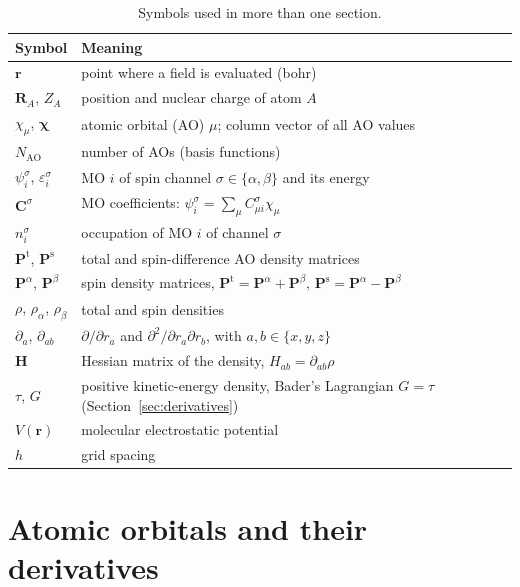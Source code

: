 \documentclass[11pt,a4paper]{article}
\begin{document}
\begin{table}[h]
\centering
\begin{tabular}{@{}ll@{}}
\toprule
Symbol & Meaning\\
\midrule
$\mathbf r$ & point where a field is evaluated (bohr)\\
$\mathbf R_A$, $Z_A$ & position and nuclear charge of atom $A$\\
$\chi_\mu$, $\boldsymbol\chi$ & atomic orbital (AO) $\mu$; column vector of all AO values\\
$N_{\mathrm{AO}}$ & number of AOs (basis functions)\\
$\psi_i^\sigma$, $\varepsilon_i^\sigma$ & MO $i$ of spin channel $\sigma\in\{\alpha,\beta\}$ and its energy\\
$\mathbf C^\sigma$ & MO coefficients: $\psi_i^\sigma=\sum_\mu C^\sigma_{\mu i}\chi_\mu$\\
$n_i^\sigma$ & occupation of MO $i$ of channel $\sigma$\\
$\mathbf P^{\mathrm t}$, $\mathbf P^{\mathrm s}$ & total and spin-difference AO density matrices\\
$\mathbf P^\alpha$, $\mathbf P^\beta$ & spin density matrices, $\mathbf P^{\mathrm t}=\mathbf P^\alpha+\mathbf P^\beta$, $\mathbf P^{\mathrm s}=\mathbf P^\alpha-\mathbf P^\beta$\\
$\rho$, $\rho_\alpha$, $\rho_\beta$ & total and spin densities\\
$\partial_a$, $\partial_{ab}$ & $\partial/\partial r_a$ and $\partial^2/\partial r_a\partial r_b$, with $a,b\in\{x,y,z\}$\\
$\mathbf H$ & Hessian matrix of the density, $H_{ab}=\partial_{ab}\rho$\\
$\tau$, $G$ & positive kinetic-energy density, Bader's Lagrangian $G=\tau$ (Section~\ref{sec:derivatives})\\
$V(\mathbf r)$ & molecular electrostatic potential\\
$h$ & grid spacing\\
\bottomrule
\end{tabular}
\caption{Symbols used in more than one section.}
\label{tab:notation}
\end{table}

\section{Atomic orbitals and their derivatives}\label{sec:aos}
\end{document}
